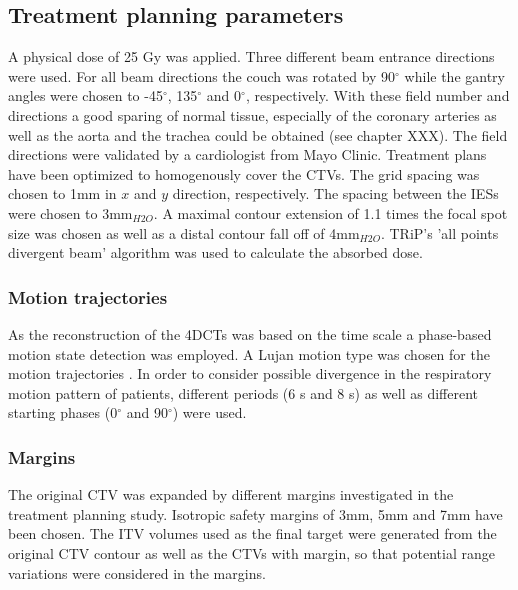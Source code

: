 \documentclass[type=dr, dr=rernat, accentcolor=tud7b,colorbacktitle, bigchapter, openright, twoside, 12pt ]{tudthesis}
\begin{document}
\subsection{Treatment planning parameters}

A physical dose of 25 Gy was applied. Three different beam entrance directions were used. For all beam directions the couch was rotated by 90$^{\circ}$ while the 
gantry angles were chosen to -45$^{\circ}$, 135$^{\circ}$ and 0$^{\circ}$, respectively. 
With these field number and directions a good sparing of normal tissue, especially of the coronary arteries as well as the aorta and the trachea  
could be obtained (see chapter XXX). The field directions were validated by a cardiologist from Mayo Clinic. 
Treatment plans have been optimized to homogenously cover the CTVs. The grid spacing was chosen to 1$\mathrm{mm}$ in $x$ and $y$ direction, 
respectively. The spacing between the IESs were chosen to 3mm$_{H2O}$. A maximal contour extension of 1.1 times the focal spot size 
was chosen as well as a distal contour fall off of 4mm$_{H2O}$. TRiP's 'all points divergent beam' algorithm was used to calculate the 
absorbed dose. 

\subsubsection{Motion trajectories}

As the reconstruction of the 4DCTs was based on the time scale a phase-based motion state detection was employed. A Lujan motion type was 
chosen for the motion trajectories \cite{Luj99}. In order to consider possible divergence in the respiratory motion pattern of patients, 
different periods (6 s and 8 s) as well as different starting phases (0$^{\circ}$ and 90$^{\circ}$) were used. 


\subsubsection{Margins}

The original CTV was expanded by different margins investigated in the treatment planning study. Isotropic 
safety margins of 3mm, 5mm and 7mm have been chosen. The ITV volumes used as the final target were generated from the original CTV contour 
as well as the CTVs with margin, so that potential range variations were considered in the margins. 
\end{document}
